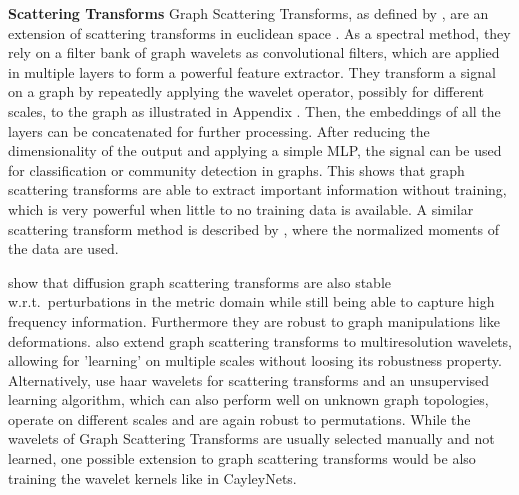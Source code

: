 \documentclass{article}
\begin{document}
\textbf{Scattering Transforms}
Graph Scattering Transforms, as defined by \citet{zou2019graph}, are an extension of scattering transforms in euclidean space \cite{bruna2013invariant}. As a spectral method, they rely on a filter bank of graph wavelets as convolutional filters, which are applied in multiple layers to form a powerful feature extractor. They transform a signal on a graph by repeatedly applying the wavelet operator, possibly for different scales, to the graph as illustrated in Appendix . Then, the embeddings of all the layers can be concatenated for further processing. %
After reducing the dimensionality of the output and applying a simple MLP, the signal can be used for classification or community detection in graphs. This shows that graph scattering transforms are able to extract important information without training, which is very powerful when little to no training data is available. %
A similar scattering transform method is described by \citet{gao2019geometric}, where the normalized moments of the data are used.

\citet{gama2019diffusion} show that diffusion graph scattering transforms are also stable w.r.t.\ perturbations in the metric domain while still being able to capture high frequency information.
Furthermore they are robust to graph manipulations like deformations. 
\citet{gama2019stability} also extend graph scattering transforms to multiresolution wavelets, allowing for 'learning' on multiple scales without loosing its robustness property. Alternatively, \citet{chen2014unsupervised} use haar wavelets for scattering transforms and an unsupervised learning algorithm, which can also perform well on unknown graph topologies, operate on different scales and are again robust to permutations.
While the wavelets of Graph Scattering Transforms are usually selected manually and not learned, one possible extension to graph scattering transforms would be also training the wavelet kernels like in CayleyNets.
\end{document}
